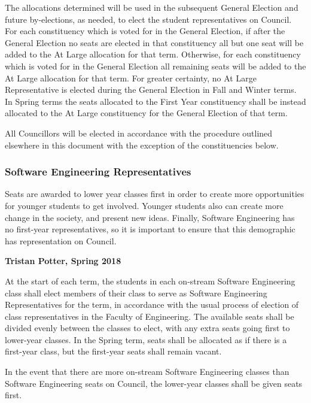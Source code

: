 The allocations determined will be used in the subsequent General Election and
future by-elections, as needed, to elect the student representatives on
Council. For each constituency which is voted for in the General Election, if 
after the General Election no seats are elected in that constituency all but 
one seat will be added to the At Large allocation for that term. Otherwise,
for each constituency which is voted for in the General Election all remaining
seats will be added to the At Large allocation for that term. For greater certainty,
no At Large Representative is elected during the General Election in Fall and Winter terms. 
In Spring terms the seats allocated to the First Year constituency shall be instead allocated
to the At Large constituency for the General Election of that term. 


All Councillors will be elected in accordance with the procedure outlined
elsewhere in this document with the exception of the constituencies below.

\subsubsection{Software Engineering Representatives}
\begin{annotation}
    Seats are awarded to lower year classes first in order to create more
    opportunities for younger students to get involved. Younger students also
    can create more change in the society, and present new ideas. Finally,
    Software Engineering has no first-year representatives, so it is important
    to ensure that this demographic has representation on Council.
    
    \textbf{Tristan Potter, Spring 2018}
\end{annotation}

At the start of each term, the students in each on-stream Software Engineering
class shall elect members of their class to serve as Software Engineering
Representatives for the term, in accordance with the usual process of election
of class representatives in the Faculty of Engineering. The available seats
shall be divided evenly between the classes to elect, with any extra seats going
first to lower-year classes. In the Spring term, seats shall be allocated as if
there is a first-year class, but the first-year seats shall remain vacant.

In the event that there are more on-stream Software Engineering classes than
Software Engineering seats on Council, the lower-year classes shall be given
seats first.

